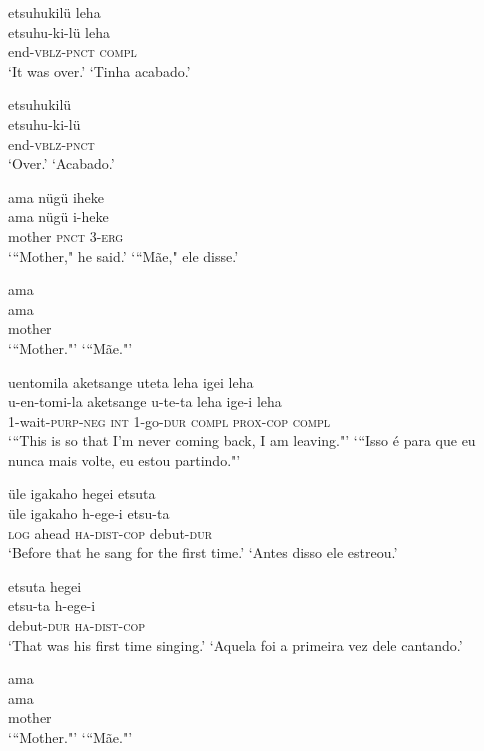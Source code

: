 \documentclass[output=paper,
modfonts,nonflat
]{langsci/langscibook}
\begin{document}
\ea  etsuhukilü leha\\[.3em]
\gll etsuhu-ki-lü leha\\
     end-\textsc{vblz}-\textsc{pnct} \textsc{compl}\\
\glt ‘It was over.’
\glt ‘Tinha acabado.’
\z

\ea  etsuhukilü\\[.3em]
\gll etsuhu-ki-lü\\
     end-\textsc{vblz}-\textsc{pnct}\\
\glt ‘Over.’
\glt ‘Acabado.’
\z

\ea  ama nügü iheke\\[.3em]
\gll ama nügü i-heke\\
     mother \textsc{pnct} 3-\textsc{erg}\\
\glt ‘“Mother," he said.’
\glt ‘“Mãe," ele disse.’
\z

\ea  ama\\[.3em]
\gll ama\\
     mother\\
\glt ‘“Mother."’
\glt ‘“Mãe."’
\z

\ea  uentomila aketsange uteta leha igei leha\\[.3em]
\gll u-en-tomi-la aketsange u-te-ta leha ige-i leha\\
     \textsc{1}-wait-\textsc{purp}-\textsc{neg} \textsc{int} \textsc{1}-go-\textsc{dur} \textsc{compl} \textsc{prox}-\textsc{cop} \textsc{compl}\\
\glt ‘“This is so that I'm never coming back, I am leaving."’
\glt ‘“Isso é para que eu nunca mais volte, eu estou partindo."’
\z

\ea  üle igakaho hegei etsuta\\[.3em]
\gll üle igakaho h-ege-i etsu-ta\\
     \textsc{log} ahead \textsc{ha}-\textsc{dist}-\textsc{cop} debut-\textsc{dur}\\
\glt ‘Before that he sang for the first time.’
\glt ‘Antes disso ele estreou.’
\z

\ea  etsuta hegei\\[.3em]
\gll etsu-ta h-ege-i\\
     debut-\textsc{dur} \textsc{ha}-\textsc{dist}-\textsc{cop}\\
\glt ‘That was his first time singing.’
\glt ‘Aquela foi a primeira vez dele cantando.’
\z

\ea  ama\\[.3em]
\gll ama\\
     mother\\
\glt ‘“Mother."’
\glt ‘“Mãe."’
\z
\end{document}
